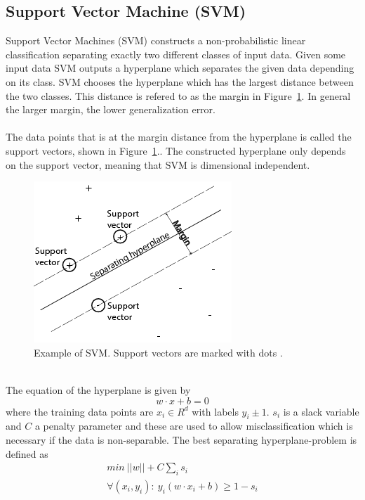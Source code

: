 \subsection{Support Vector Machine (SVM)}
Support Vector Machines (SVM) constructs a non-probabilistic linear classification separating exactly two different classes of input data. Given some input data SVM outputs a hyperplane which separates the given data depending on its class. SVM chooses the hyperplane which has the largest distance between the two classes. This distance is refered to as the margin in Figure~\ref{fig:svm}. In general the larger margin, the lower generalization error. \citep{svm_ai} \\\\
The data points that is at the margin distance from the hyperplane is called the support vectors, shown in Figure~\ref{fig:svm}.. The constructed hyperplane only depends on the support vector, meaning that SVM is dimensional independent.
\begin{figure}[h!]
\centering
\includegraphics[scale = 0.7]{fig/svmhyperplane.png}
\caption{Example of SVM. Support vectors are marked with dots \citep{svm_picture}. }
\label{fig:svm}
\end{figure} \\
The equation of the hyperplane is given by
\begin{equation}
w \cdot x + b = 0
\end{equation}
where the training data points are $x_i \in R^d$ with labels $y_i \pm 1$. $s_i$ is a slack variable and $C$ a penalty parameter and these are used to allow misclassification which is necessary if the data is non-separable. The best separating hyperplane-problem is defined as
\begin{equation}
\begin{array}{l}
min \: ||w|| + C \sum_{i} s_i \\
\forall (x_i, y_i) : \: y_i(w \cdot x_i + b) \geq 1 - s_i
\end{array}
\end{equation}
